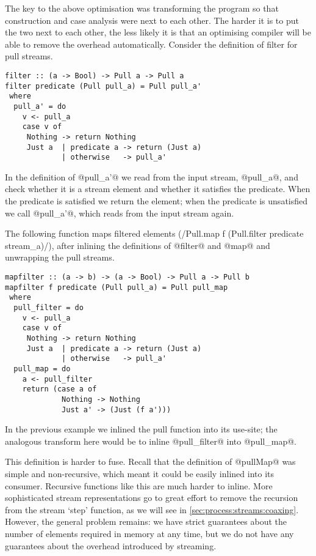 The key to the above optimisation was transforming the program so that construction and case analysis were next to each other.
The harder it is to put the two next to each other, the less likely it is that an optimising compiler will be able to remove the overhead automatically.
Consider the definition of filter for pull streams.

\begin{lstlisting}
filter :: (a -> Bool) -> Pull a -> Pull a
filter predicate (Pull pull_a) = Pull pull_a'
 where
  pull_a' = do
    v <- pull_a
    case v of
     Nothing -> return Nothing
     Just a  | predicate a -> return (Just a)
             | otherwise   -> pull_a'
\end{lstlisting}

In the definition of @pull_a'@ we read from the input stream, @pull_a@, and check whether it is a stream element and whether it satisfies the predicate.
When the predicate is satisfied we return the element; when the predicate is unsatisfied we call @pull_a'@, which reads from the input stream again.

The following function maps filtered elements (\Hs/Pull.map f (Pull.filter predicate stream_a)/), after inlining the definitions of @filter@ and @map@ and unwrapping the pull streams.

\begin{lstlisting}
mapfilter :: (a -> b) -> (a -> Bool) -> Pull a -> Pull b
mapfilter f predicate (Pull pull_a) = Pull pull_map
 where
  pull_filter = do
    v <- pull_a
    case v of
     Nothing -> return Nothing
     Just a  | predicate a -> return (Just a)
             | otherwise   -> pull_a'
  pull_map = do
    a <- pull_filter
    return (case a of
             Nothing -> Nothing
             Just a' -> (Just (f a')))
\end{lstlisting}

In the previous example we inlined the pull function into its use-site; the analogous transform here would be to inline @pull_filter@ into @pull_map@.

This definition is harder to fuse. Recall that the definition of @pullMap@ was simple and non-recursive, which meant it could be easily inlined into its consumer.
Recursive functions like this are much harder to inline.
More sophisticated stream representations go to great effort to remove the recursion from the stream `step' function, as we will see in \autoref{sec:process:streams:coaxing}.
However, the general problem remains: we have strict guarantees about the number of elements required in memory at any time, but we do not have any guarantees about the overhead introduced by streaming.

